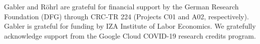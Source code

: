 Gabler and Röhrl are grateful for financial support by the German Research Foundation
(DFG) through CRC-TR 224 (Projects C01 and A02, respectively). Gabler is grateful for
funding by IZA Institute of Labor Economics.
We gratefully acknowledge support from the Google Cloud COVID-19 research credits program.
